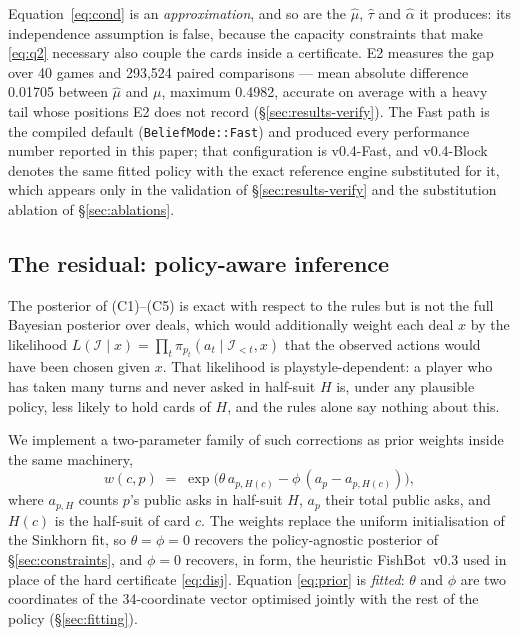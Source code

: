 \documentclass[11pt]{article}
\theoremstyle{definition}
\DeclareRobustCommand{\vfast}{\texorpdfstring{\mbox{v0.4-Fast}}{v0.4-Fast}}
\DeclareRobustCommand{\vblock}{\texorpdfstring{\mbox{v0.4-Block}}{v0.4-Block}}
\DeclareRobustCommand{\vthree}{\texorpdfstring{\mbox{FishBot v0.3}}{FishBot v0.3}}
\newcommand{\numSinkhornMean}{0.01705}
\newcommand{\numSinkhornMax}{0.4982}
\newcommand{\numParams}{34}
\newcommand{\numSelftestGames}{40}
\newcommand{\numSelftestChecks}{293{,}524}
\begin{document}
Equation~\eqref{eq:cond} is an \emph{approximation}, and so are the $\hat\mu$,
$\hat\tau$ and $\hat\alpha$ it produces: its independence assumption is false,
because the capacity constraints that make \eqref{eq:q2} necessary also couple
the cards inside a certificate. E2 measures the gap over \numSelftestGames{}
games and \numSelftestChecks{} paired comparisons --- mean absolute difference
\numSinkhornMean{} between $\hat\mu$ and $\mu$, maximum \numSinkhornMax{},
accurate on average with a heavy tail whose positions E2 does not record
(\S\ref{sec:results-verify}). The Fast path is the compiled default
(\texttt{BeliefMode::Fast}) and produced every performance number reported in
this paper; that configuration is \vfast{}, and \vblock{} denotes the same
fitted policy with the exact reference engine substituted for it, which
appears only in the validation of \S\ref{sec:results-verify} and the
substitution ablation of \S\ref{sec:ablations}.

\subsection{The residual: policy-aware inference}
\label{sec:policyprior}

The posterior of (C1)--(C5) is exact with respect to the rules but is not the
full Bayesian posterior over deals, which would additionally weight each deal
$x$ by the likelihood $L(\mathcal{I} \mid x) = \prod_t \pi_{p_t}(a_t \mid
\mathcal{I}_{<t}, x)$ that the observed actions would have been chosen given
$x$. That likelihood is playstyle-dependent: a player who has taken many turns
and never asked in half-suit $H$ is, under any plausible policy, less likely
to hold cards of $H$, and the rules alone say nothing about this.

We implement a two-parameter family of such corrections as prior weights inside
the same machinery,
\begin{equation}
  w(c,p) \;=\; \exp\!\bigl(\theta\, a_{p,H(c)} - \phi\,(a_p - a_{p,H(c)})\bigr),
  \label{eq:prior}
\end{equation}
where $a_{p,H}$ counts $p$'s public asks in half-suit $H$, $a_p$ their total
public asks, and $H(c)$ is the half-suit of card $c$. The weights replace the
uniform initialisation of the Sinkhorn fit, so $\theta = \phi = 0$ recovers
the policy-agnostic posterior of \S\ref{sec:constraints}, and $\phi = 0$
recovers, in form, the heuristic \vthree{} used in place of the hard
certificate \eqref{eq:disj}. Equation \eqref{eq:prior} is \emph{fitted}:
$\theta$ and $\phi$ are two coordinates of the \numParams-coordinate vector
optimised jointly with the rest of the policy (\S\ref{sec:fitting}).
\end{document}

